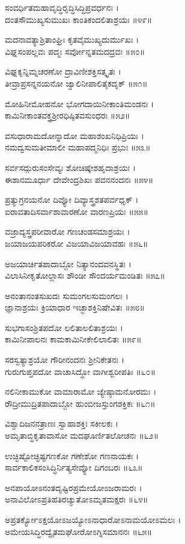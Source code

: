 ಸಂವರ್ಧಿತಮಹಾವೃದ್ಧಿರೃದ್ಧಿಸಿದ್ಧಿಪ್ರವರ್ಧನಃ ।\\
ದಂತಸೌಮುಖ್ಯಸುಮುಖಃ ಕಾಂತಿಕಂದಲಿತಾಶ್ರಯಃ ॥೪೯॥

ಮದನಾವತ್ಯಾಶ್ರಿತಾಂಘ್ರಿಃ ಕೃತವೈಮುಖ್ಯದುರ್ಮುಖಃ ।\\
ವಿಘ್ನಸಂಪಲ್ಲವಃ ಪದ್ಮಃ ಸರ್ವೋನ್ನತಮದದ್ರವಃ ॥೫೦॥

ವಿಘ್ನಕೃನ್ನಿಮ್ನಚರಣೋ ದ್ರಾವಿಣೀಶಕ್ತಿಸತ್ಕೃತಃ ।\\
ತೀವ್ರಾಪ್ರಸನ್ನನಯನೋ ಜ್ವಾಲಿನೀಪಾಲಿತೈಕದೃಕ್ ॥೫೧॥

ಮೋಹಿನೀಮೋಹನೋ ಭೋಗದಾಯಿನೀಕಾಂತಿಮಂಡನಃ ।\\
ಕಾಮಿನೀಕಾಂತವಕ್ತ್ರಶ್ರೀರಧಿಷ್ಠಿತವಸುಂಧರಃ ॥೫೨॥

ವಸುಧಾರಾಮದೋನ್ನಾದೋ ಮಹಾಶಂಖನಿಧಿಪ್ರಿಯಃ ।\\
ನಮದ್ವಸುಮತೀಮಾಲೀ ಮಹಾಪದ್ಮನಿಧಿಃ ಪ್ರಭುಃ ॥೫೩॥

ಸರ್ವಸದ್ಗುರುಸಂಸೇವ್ಯಃ ಶೋಚಿಷ್ಕೇಶಹೃದಾಶ್ರಯಃ ।\\
ಈಶಾನಮೂರ್ಧಾ ದೇವೇಂದ್ರಶಿಖಃ ಪವನನಂದನಃ ॥೫೪॥

ಪ್ರತ್ಯುಗ್ರನಯನೋ ದಿವ್ಯೋ ದಿವ್ಯಾಸ್ತ್ರಶತಪರ್ವಧೃಕ್ ।\\
ಐರಾವತಾದಿಸರ್ವಾಶಾವಾರಣೋ ವಾರಣಪ್ರಿಯಃ ॥೫೫॥

ವಜ್ರಾದ್ಯಸ್ತ್ರಪರೀವಾರೋ ಗಣಚಂಡಸಮಾಶ್ರಯಃ ।\\
ಜಯಾಜಯಪರಿಕರೋ ವಿಜಯಾವಿಜಯಾವಹಃ ॥೫೬॥

ಅಜಯಾರ್ಚಿತಪಾದಾಬ್ಜೋ ನಿತ್ಯಾನಂದವನಸ್ಥಿತಃ ।\\
ವಿಲಾಸಿನೀಕೃತೋಲ್ಲಾಸಃ ಶೌಂಡೀ ಸೌಂದರ್ಯಮಂಡಿತಃ ॥೫೭॥

ಅನಂತಾನಂತಸುಖದಃ ಸುಮಂಗಲಸುಮಂಗಲಃ ।\\
ಜ್ಞಾನಾಶ್ರಯಃ ಕ್ರಿಯಾಧಾರ ಇಚ್ಛಾಶಕ್ತಿನಿಷೇವಿತಃ ॥೫೮॥

ಸುಭಗಾಸಂಶ್ರಿತಪದೋ ಲಲಿತಾಲಲಿತಾಶ್ರಯಃ ।\\
ಕಾಮಿನೀಪಾಲನಃ ಕಾಮಕಾಮಿನೀಕೇಲಿಲಾಲಿತಃ ॥೫೯॥

ಸರಸ್ವತ್ಯಾಶ್ರಯೋ ಗೌರೀನಂದನಃ ಶ್ರೀನಿಕೇತನಃ ।\\
ಗುರುಗುಪ್ತಪದೋ ವಾಚಾಸಿದ್ಧೋ ವಾಗೀಶ್ವರೀಪತಿಃ ॥೬೦॥

ನಲಿನೀಕಾಮುಕೋ ವಾಮಾರಾಮೋ ಜ್ಯೇಷ್ಠಾಮನೋರಮಃ ।\\
ರೌದ್ರೀಮುದ್ರಿತಪಾದಾಬ್ಜೋ ಹುಂಬೀಜಸ್ತುಂಗಶಕ್ತಿಕಃ ॥೬೧॥

ವಿಶ್ವಾದಿಜನನತ್ರಾಣಃ ಸ್ವಾಹಾಶಕ್ತಿಃ ಸಕೀಲಕಃ ।\\
ಅಮೃತಾಬ್ಧಿಕೃತಾವಾಸೋ ಮದಘೂರ್ಣಿತಲೋಚನಃ ॥೬೨॥

ಉಚ್ಛಿಷ್ಟೋಚ್ಛಿಷ್ಟಗಣಕೋ ಗಣೇಶೋ ಗಣನಾಯಕಃ ।\\
ಸಾರ್ವಕಾಲಿಕಸಂಸಿದ್ಧಿರ್ನಿತ್ಯಸೇವ್ಯೋ ದಿಗಂಬರಃ ॥೬೩॥

ಅನಪಾಯೋಽನಂತದೃಷ್ಟಿರಪ್ರಮೇಯೋಽಜರಾಮರಃ ।\\
ಅನಾವಿಲೋಽಪ್ರತಿಹತಿರಚ್ಯುತೋಽಮೃತಮಕ್ಷರಃ ॥೬೪॥

ಅಪ್ರತರ್ಕ್ಯೋಽಕ್ಷಯೋಽಜಯ್ಯೋಽನಾಧಾರೋಽನಾಮಯೋಽಮಲಃ ।\\
ಅಮೇಯಸಿದ್ಧಿರದ್ವೈತಮಘೋರೋಽಗ್ನಿಸಮಾನನಃ ॥೬೫॥

